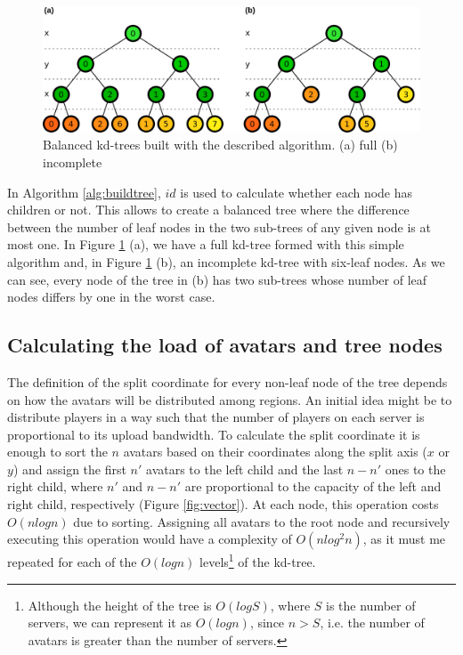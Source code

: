 \documentclass[acmjacm]{acmtrans2m}
\newcommand{\figurecaption}{Figure}
\begin{document}
\begin{figure}[!t]
	\centering
	\includegraphics[width=\linewidth]{images/kdtree}
	\caption{Balanced kd-trees built with the described algorithm. (a) full (b) incomplete}
	\label{fig:kdtree}
\end{figure}

In Algorithm \ref{alg:buildtree}, $id$ is used to calculate whether each node has children or not. This allows to create a balanced tree where the difference between the number of leaf nodes in the two sub-trees of any given node is at most one. In \figurecaption{} \ref{fig:kdtree} (a), we have a full kd-tree formed with this simple algorithm and, in \figurecaption{} \ref{fig:kdtree} (b), an incomplete kd-tree with six-leaf nodes. As we can see, every node of the tree in (b) has two sub-trees whose number of leaf nodes differs by one in the worst case.

\subsection{Calculating the load of avatars and tree nodes}

The definition of the split coordinate for every non-leaf node of the tree depends on how the avatars will be distributed among regions. An initial idea might be to distribute players in a way such that the number of players on each server is proportional to its upload bandwidth. To calculate the split coordinate it is enough to sort the $n$ avatars based on their coordinates along the split axis ($x$ or $y$) and assign the first $n'$ avatars to the left child and the last $n - n'$ ones to the right child, where $n'$ and $n - n'$ are proportional to the capacity of the left and right child, respectively (\figurecaption{} \ref{fig:vector}). At each node, this operation costs $O(nlogn)$ due to sorting. Assigning all avatars to the root node and recursively executing this operation would have a complexity of $O(nlog^2n)$, as it must me repeated for each of the $O(logn)$ levels\footnote{Although the height of the tree is $O(logS)$, where $S$ is the number of servers, we can represent it as $O(logn)$, since $n > S$, i.e. the number of avatars is greater than the number of servers.} of the kd-tree.
\end{document}
